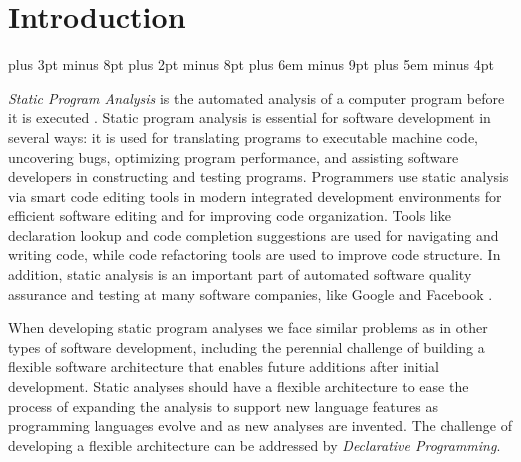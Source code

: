 \documentclass[10pt, twoside, openright]{book}
\begin{document}
\section{Introduction}

\abovedisplayskip=0pt plus 3pt minus 8pt
\abovedisplayshortskip=0pt plus 2pt minus 8pt
\belowdisplayskip=12pt plus 6em minus 9pt
\belowdisplayshortskip=7pt plus 5em minus 4pt



\emph{Static Program Analysis} is the automated analysis of a computer program before it is executed
\cite{moller2018static,Binkley:2007:SCA:1253532.1254713}.
Static program analysis is essential for software development in several ways:
it is used for translating programs to executable machine code, uncovering bugs,
optimizing program performance, and assisting
software developers in constructing and testing programs.
Programmers use static analysis via smart code editing tools in modern integrated development
environments for efficient software editing and for improving code organization.
Tools like declaration lookup and code completion suggestions are used for navigating and
writing code, while code refactoring tools are used to improve code structure.
In addition, static analysis is an important part of automated software quality assurance
and testing
at many software companies, like Google \cite{Sadowski:2018:LBS:3200906.3188720} and
Facebook \cite{DBLP:conf/nfm/CalcagnoDDGHLOP15}.




When developing static program analyses we face similar problems as in other types
of software development, including
the perennial challenge of building a flexible software architecture that enables
future additions after initial development.  %
Static analyses should have a flexible
architecture to ease the process of expanding the analysis to support new language features
as programming
languages evolve and as new analyses are invented.
The challenge of developing a flexible architecture can be addressed by \emph{Declarative
Programming}.
\end{document}
